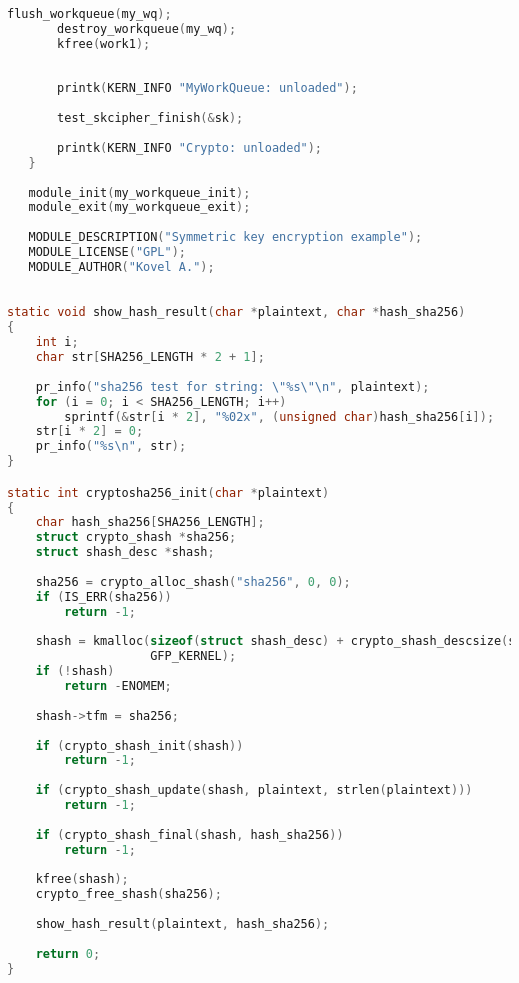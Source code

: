\begin{lstlisting}[language=c, label=rudakov-menya-ne-spaset, caption=Загружаемый модуль ядра]
       flush_workqueue(my_wq);
       destroy_workqueue(my_wq);
       kfree(work1);
   
       
       printk(KERN_INFO "MyWorkQueue: unloaded");
   
       test_skcipher_finish(&sk);
   
       printk(KERN_INFO "Crypto: unloaded");
   }
    
   module_init(my_workqueue_init);
   module_exit(my_workqueue_exit);
    
   MODULE_DESCRIPTION("Symmetric key encryption example");
   MODULE_LICENSE("GPL");
   MODULE_AUTHOR("Kovel A.");    
\end{lstlisting}

\begin{lstlisting}[language=c, label=rudakov-menya-ne-spaset, caption=Функия хеширования]

static void show_hash_result(char *plaintext, char *hash_sha256)
{
    int i;
    char str[SHA256_LENGTH * 2 + 1];
 
    pr_info("sha256 test for string: \"%s\"\n", plaintext);
    for (i = 0; i < SHA256_LENGTH; i++)
        sprintf(&str[i * 2], "%02x", (unsigned char)hash_sha256[i]);
    str[i * 2] = 0;
    pr_info("%s\n", str);
}

static int cryptosha256_init(char *plaintext) 
{
    char hash_sha256[SHA256_LENGTH];
    struct crypto_shash *sha256;
    struct shash_desc *shash;
 
    sha256 = crypto_alloc_shash("sha256", 0, 0);
    if (IS_ERR(sha256))
        return -1;
 
    shash = kmalloc(sizeof(struct shash_desc) + crypto_shash_descsize(sha256),
                    GFP_KERNEL);
    if (!shash)
        return -ENOMEM;
 
    shash->tfm = sha256;
 
    if (crypto_shash_init(shash))
        return -1;
 
    if (crypto_shash_update(shash, plaintext, strlen(plaintext)))
        return -1;
 
    if (crypto_shash_final(shash, hash_sha256))
        return -1;
 
    kfree(shash);
    crypto_free_shash(sha256);
 
    show_hash_result(plaintext, hash_sha256);
 
    return 0;
}
\end{lstlisting}
